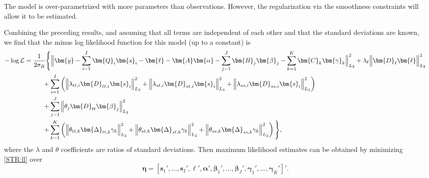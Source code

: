 \documentclass[11pt,a4paper,]{article}
\begin{document}
The model is over-parametrized with more parameters than observations. However, the regularization via the smoothness constraints will allow it to be estimated.

Combining the preceding results, and assuming that all terms are independent of each other and that the standard deviations are known, we find that the minus log likelihood function for this model (up to a constant) is
\begin{align}
  -\log \mathcal{L} &=
  \frac{1}{2\sigma_R}
  \Bigg\{
    \Big\|\bm{y}- \sum_{i=1}^I \bm{Q}_i\bm{s}_i - \bm{\ell} -
    \bm{A}\bm{\alpha} -
    \sum_{j=1}^{J} \bm{B}_j \bm{\beta}_j -
    \sum_{k=1}^{K} \bm{C}_k \bm{\gamma}_{k}
     \Big\|_{L_2}^2
    + \lambda_\ell\Big\|\bm{D}_\ell \bm{\ell}\Big\|_{L_2}^2\nonumber\\
  & \hspace*{1cm}\mbox{} + \sum_{i=1}^{I}\left(
                  \left\|\lambda_{tt,i} \bm{D}_{tt,i} \bm{s}_i \right\|_{L_2}^2 +
                  \left\|\lambda_{st,i} \bm{D}_{st,i} \bm{s}_i \right\|_{L_2}^2 +
                  \left\|\lambda_{ss,i} \bm{D}_{ss,i} \bm{s}_i \right\|_{L_2}^2 \right)
    \nonumber\\
  & \hspace*{1cm}\mbox{} +
           \sum_{j=1}^{J}\left\|\theta_j \bm{D}_{tt} \bm{\beta}_j\right\|_{L_2}^2
    \nonumber\\
  &  \hspace*{1cm}\mbox{}+ \sum_{k=1}^{K}\left(
      \left\|\theta_{tt,k} \bm{\Delta}_{tt,k} \gamma_k\right\|_{L_2}^2
    + \left\|\theta_{st,k} \bm{\Delta}_{st,k} \gamma_k\right\|_{L_2}^2
    + \left\|\theta_{ss,k} \bm{\Delta}_{ss,k} \gamma_k\right\|_{L_2}^2
    \right)
  \Bigg\},
  \label{STR:ll}
\end{align}
where the \(\lambda\) and \(\theta\) coefficients are ratios of standard deviations. Then maximum likelihood estimates can be obtained by minimizing \eqref{STR:ll} over
\begin{equation}\label{regr:beta}
  \bm{\eta} = [\bm{s}_1', \dots, \bm{s}_I', \bm{\ell}', \bm{\alpha}', \bm{\beta}_1', \dots , \bm{\beta}_J', \bm{\gamma}_1', \dots , \bm{\gamma}_K']'.
\end{equation}
\end{document}
